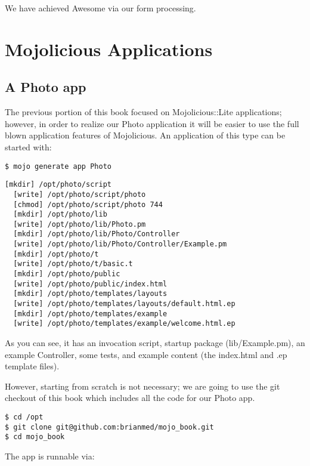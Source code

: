 \documentclass[14pt]{extreport}
\begin{document}
We have achieved Awesome via our form processing.

\chapter*{Mojolicious Applications}

\section{A Photo app}

The previous portion of this book focused on Mojolicious::Lite applications;
however, in order to realize our Photo application it will be easier to use the
full blown application features of Mojolicious.  An application of this type
can be started with:

\begin{lstlisting}[style=BashInputStyle]
$ mojo generate app Photo
\end{lstlisting}

\begin{lstlisting}[style=BashOutputStyle]
  [mkdir] /opt/photo/script
  [write] /opt/photo/script/photo
  [chmod] /opt/photo/script/photo 744
  [mkdir] /opt/photo/lib
  [write] /opt/photo/lib/Photo.pm
  [mkdir] /opt/photo/lib/Photo/Controller
  [write] /opt/photo/lib/Photo/Controller/Example.pm
  [mkdir] /opt/photo/t
  [write] /opt/photo/t/basic.t
  [mkdir] /opt/photo/public
  [write] /opt/photo/public/index.html
  [mkdir] /opt/photo/templates/layouts
  [write] /opt/photo/templates/layouts/default.html.ep
  [mkdir] /opt/photo/templates/example
  [write] /opt/photo/templates/example/welcome.html.ep
\end{lstlisting}

As you can see, it has an invocation script, startup package (lib/Example.pm),
an example Controller, some tests, and example content (the index.html and .ep
template files).

However, starting from scratch is not necessary; we are going to use the git
checkout of this book which includes all the code for our Photo app.

\begin{lstlisting}[style=BashOutputStyle]
$ cd /opt
$ git clone git@github.com:brianmed/mojo_book.git
$ cd mojo_book
\end{lstlisting}

The app is runnable via:
\end{document}
